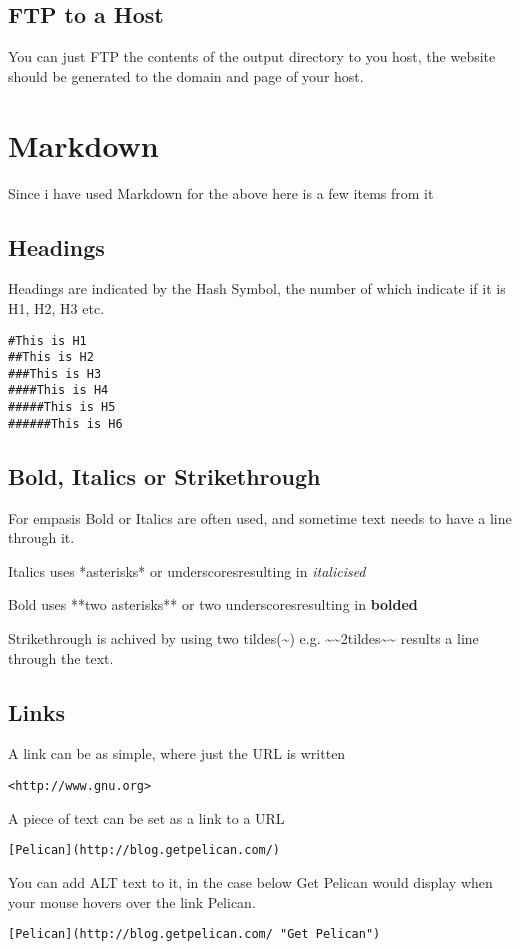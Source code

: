 \documentclass[12pt]{article}			%
\begin{document}
\subsection{FTP to a Host}
You can just FTP the contents of the output directory to you host, the website should be generated to the domain and page of your host.




\newpage
\section{Markdown}
Since i have used Markdown for the above here is a few items from it

\subsection{Headings}
Headings are indicated by the Hash Symbol, the number of which indicate if it is H1, H2, H3 etc.
\begin{verbatim}
#This is H1
##This is H2
###This is H3
####This is H4
#####This is H5
######This is H6
\end{verbatim}
\subsection{Bold, Italics or Strikethrough}
For empasis Bold or Italics are often used, and sometime text needs to have a line through it.\par
Italics uses *asterisks* or \textunderscore underscores\textunderscore resulting in \textit{italicised} \par
Bold uses **two asterisks** or \textunderscore\textunderscore two underscores\textunderscore\textunderscore resulting in \textbf{bolded} \par


Strikethrough is achived by using two tildes(\~{}) e.g. \~{}\~{}2tildes\~{}\~{} results a line through the text.

\subsection{Links}
A link can be as simple, where just the URL is written 
\begin{verbatim}
<http://www.gnu.org>
\end{verbatim}
A piece of text can be set as a link to a URL
\begin{verbatim}
[Pelican](http://blog.getpelican.com/)
\end{verbatim}
You can add ALT text to it, in the case below Get Pelican would display when your mouse hovers over the link Pelican.
\begin{verbatim}
[Pelican](http://blog.getpelican.com/ "Get Pelican")
\end{verbatim}
\end{document}
